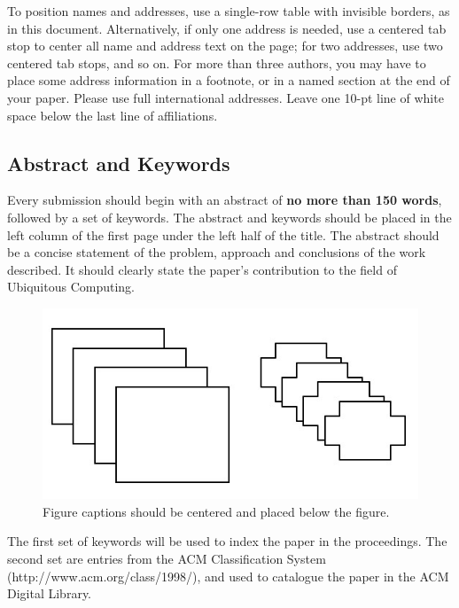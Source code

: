 \documentclass{ubicomp2013}
\begin{document}
To position names and addresses, use a single-row table with invisible
borders, as in this document.  Alternatively, if only one address is
needed, use a centered tab stop to center all name and address text on
the page; for two addresses, use two centered tab stops, and so
on. For more than three authors, you may have to place some address
information in a footnote, or in a named section at the end of your
paper. Please use full international addresses.  Leave one 10-pt line of white space below the last line of
affiliations.

\subsection{Abstract and Keywords}

Every submission should begin with an abstract of \textbf{no more than 150 words},
followed by a set of keywords. The abstract and keywords should be
placed in the left column of the first page under the left half of the
title. The abstract should be a concise statement of the problem,
approach and conclusions of the work described.  It should clearly
state the paper's contribution to the field of Ubiquitous Computing.

\begin{figure}[t]
\begin{center}
\includegraphics[width=0.90\columnwidth]{sample-fig.jpg}
\end{center}
\caption{Figure captions should be centered and placed below the
figure.}
\end{figure}

The first set of keywords will be used to index the paper in the
proceedings. The second set are entries from the ACM Classification
System
(http://www.acm.org/class/1998/), and used to catalogue the paper in the ACM
Digital Library.
\end{document}

